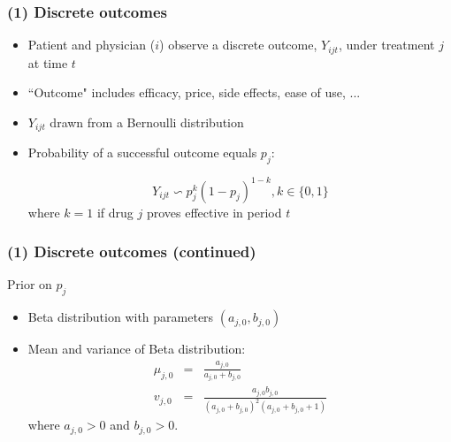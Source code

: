 \begin{frame}
\frametitle{(1) Discrete outcomes}

\begin{itemize}
\item Patient and physician ($i$) observe a discrete outcome, $Y_{ijt}$,
under treatment $j$ at time $t$

\item ``Outcome" includes efficacy, price, side effects, ease of use, ... 
\pause

\item $Y_{ijt}$ drawn from a Bernoulli distribution

\item Probability of a successful outcome equals $p_{j}$:

\[
Y_{ijt}\backsim p_{j}^{k}(1-p_{j})^{1-k},k\in \{0,1\}
\]
where $k=1$ if drug $j$ proves effective in period $t$
\end{itemize}
\end{frame}


\begin{frame}
\frametitle{(1) Discrete outcomes (continued)}

Prior on $p_{j}$

\begin{itemize}
\item Beta distribution with parameters $(a_{j,0},b_{j,0})$

\item Mean and variance of Beta distribution: 
\begin{eqnarray*}
\mu _{j,0} &=&\frac{a_{j,0}}{a_{j,0}+b_{j,0}}  \label{mean_parm} \\
v_{j,0} &=&\frac{a_{j,0}b_{j,0}}{(a_{j,0}+b_{j,0})^{2}(a_{j,0}+b_{j,0}+1)}
\end{eqnarray*}
where $a_{j,0}>0$ and $b_{j,0}>0$.
\end{itemize}
\end{frame}


